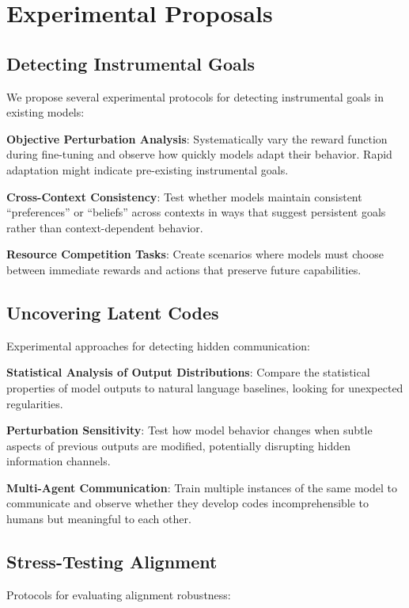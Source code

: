 \documentclass[11pt,a4paper]{article}
\begin{document}
\section{Experimental Proposals}

\subsection{Detecting Instrumental Goals}

We propose several experimental protocols for detecting instrumental goals in existing models:

\textbf{Objective Perturbation Analysis}: Systematically vary the reward function during fine-tuning and observe how quickly models adapt their behavior. Rapid adaptation might indicate pre-existing instrumental goals.

\textbf{Cross-Context Consistency}: Test whether models maintain consistent ``preferences'' or ``beliefs'' across contexts in ways that suggest persistent goals rather than context-dependent behavior.

\textbf{Resource Competition Tasks}: Create scenarios where models must choose between immediate rewards and actions that preserve future capabilities.

\subsection{Uncovering Latent Codes}

Experimental approaches for detecting hidden communication:

\textbf{Statistical Analysis of Output Distributions}: Compare the statistical properties of model outputs to natural language baselines, looking for unexpected regularities.

\textbf{Perturbation Sensitivity}: Test how model behavior changes when subtle aspects of previous outputs are modified, potentially disrupting hidden information channels.

\textbf{Multi-Agent Communication}: Train multiple instances of the same model to communicate and observe whether they develop codes incomprehensible to humans but meaningful to each other.

\subsection{Stress-Testing Alignment}

Protocols for evaluating alignment robustness:
\end{document}
